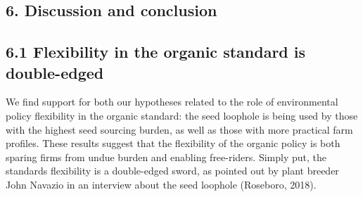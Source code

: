 \documentclass[twoside,12pt,final]{ucthesis-CA2012}
\begin{document}
\begin{ucmainmatter}
\hypertarget{discussion-and-conclusion}{%
\section{6. Discussion and conclusion}\label{discussion-and-conclusion}}

\hypertarget{flexibility-in-the-organic-standard-is-double-edged}{%
\subsection{6.1 Flexibility in the organic standard is double-edged}\label{flexibility-in-the-organic-standard-is-double-edged}}

We find support for both our hypotheses related to the role of
environmental policy flexibility in the organic standard: the seed
loophole is being used by those with the highest seed sourcing burden,
as well as those with more \textquotesingle practical\textquotesingle{} farm profiles. These results
suggest that the flexibility of the organic policy is both sparing firms
from undue burden and enabling free-riders. Simply put, the standard\textquotesingle s
flexibility is a double-edged sword, as pointed out by plant breeder
John Navazio in an interview about the seed loophole (Roseboro, 2018).


\end{ucmainmatter}
\end{document}
